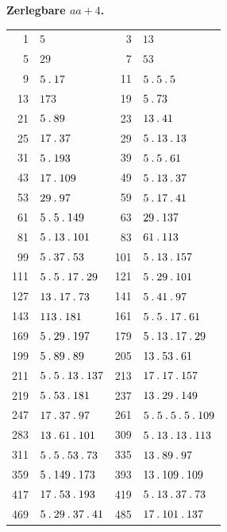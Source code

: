 \par\medskip{}
\centerline{\textbf{Zerlegbare $aa+4$.}}\nobreak\smallskip
\begingroup\small\setlength{\tabcolsep}{4pt}
\begin{longtable}{@{}r|l@{\qquad}r|l@{}}
1 & $5$ & 3 & $13$\\
5 & $29$ & 7 & $53$\\
9 & $5\mathbin{.} 17$ & 11 & $5\mathbin{.} 5\mathbin{.} 5$\\
13 & $173$ & 19 & $5\mathbin{.} 73$\\
21 & $5\mathbin{.} 89$ & 23 & $13\mathbin{.} 41$\\
25 & $17\mathbin{.} 37$ & 29 & $5\mathbin{.} 13\mathbin{.} 13$\\
31 & $5\mathbin{.} 193$ & 39 & $5\mathbin{.} 5\mathbin{.} 61$\\
43 & $17\mathbin{.} 109$ & 49 & $5\mathbin{.} 13\mathbin{.} 37$\\
53 & $29\mathbin{.} 97$ & 59 & $5\mathbin{.} 17\mathbin{.} 41$\\
61 & $5\mathbin{.} 5\mathbin{.} 149$ & 63 & $29\mathbin{.} 137$\\
81 & $5\mathbin{.} 13\mathbin{.} 101$ & 83 & $61\mathbin{.} 113$\\
99 & $5\mathbin{.} 37\mathbin{.} 53$ & 101 & $5\mathbin{.} 13\mathbin{.} 157$\\
111 & $5\mathbin{.} 5\mathbin{.} 17\mathbin{.} 29$ & 121 & $5\mathbin{.} 29\mathbin{.} 101$\\
127 & $13\mathbin{.} 17\mathbin{.} 73$ & 141 & $5\mathbin{.} 41\mathbin{.} 97$\\
143 & $113\mathbin{.} 181$ & 161 & $5\mathbin{.} 5\mathbin{.} 17\mathbin{.} 61$\\
169 & $5\mathbin{.} 29\mathbin{.} 197$ & 179 & $5\mathbin{.} 13\mathbin{.} 17\mathbin{.} 29$\\
199 & $5\mathbin{.} 89\mathbin{.} 89$ & 205 & $13\mathbin{.} 53\mathbin{.} 61$\\
211 & $5\mathbin{.} 5\mathbin{.} 13\mathbin{.} 137$ & 213 & $17\mathbin{.} 17\mathbin{.} 157$\\
219 & $5\mathbin{.} 53\mathbin{.} 181$ & 237 & $13\mathbin{.} 29\mathbin{.} 149$\\
247 & $17\mathbin{.} 37\mathbin{.} 97$ & 261 & $5\mathbin{.} 5\mathbin{.} 5\mathbin{.} 5\mathbin{.} 109$\\
283 & $13\mathbin{.} 61\mathbin{.} 101$ & 309 & $5\mathbin{.} 13\mathbin{.} 13\mathbin{.} 113$\\
311 & $5\mathbin{.} 5\mathbin{.} 53\mathbin{.} 73$ & 335 & $13\mathbin{.} 89\mathbin{.} 97$\\
359 & $5\mathbin{.} 149\mathbin{.} 173$ & 393 & $13\mathbin{.} 109\mathbin{.} 109$\\
417 & $17\mathbin{.} 53\mathbin{.} 193$ & 419 & $5\mathbin{.} 13\mathbin{.} 37\mathbin{.} 73$\\
469 & $5\mathbin{.} 29\mathbin{.} 37\mathbin{.} 41$ & 485 & $17\mathbin{.} 101\mathbin{.} 137$\\

\end{longtable}
